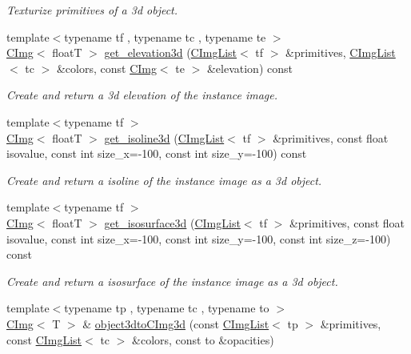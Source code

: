 \begin{DoxyCompactItemize}
\begin{DoxyCompactList}\small\item\em Texturize primitives of a 3d object. \item\end{DoxyCompactList}\item 
{\footnotesize template$<$typename tf , typename tc , typename te $>$ }\\\hyperlink{structcimg__library_1_1CImg}{CImg}$<$ floatT $>$ \hyperlink{structcimg__library_1_1CImg_af8a421b285e0b85ea6ab2fd4a2e6736e}{get\_\-elevation3d} (\hyperlink{structcimg__library_1_1CImgList}{CImgList}$<$ tf $>$ \&primitives, \hyperlink{structcimg__library_1_1CImgList}{CImgList}$<$ tc $>$ \&colors, const \hyperlink{structcimg__library_1_1CImg}{CImg}$<$ te $>$ \&elevation) const 
\begin{DoxyCompactList}\small\item\em Create and return a 3d elevation of the instance image. \item\end{DoxyCompactList}\item 
{\footnotesize template$<$typename tf $>$ }\\\hyperlink{structcimg__library_1_1CImg}{CImg}$<$ floatT $>$ \hyperlink{structcimg__library_1_1CImg_a4ba336aae4888342fc51a1cef2abd6ce}{get\_\-isoline3d} (\hyperlink{structcimg__library_1_1CImgList}{CImgList}$<$ tf $>$ \&primitives, const float isovalue, const int size\_\-x=-\/100, const int size\_\-y=-\/100) const 
\begin{DoxyCompactList}\small\item\em Create and return a isoline of the instance image as a 3d object. \item\end{DoxyCompactList}\item 
{\footnotesize template$<$typename tf $>$ }\\\hyperlink{structcimg__library_1_1CImg}{CImg}$<$ floatT $>$ \hyperlink{structcimg__library_1_1CImg_a7b242fb94ccc9d4404fb844f1ba1fa9e}{get\_\-isosurface3d} (\hyperlink{structcimg__library_1_1CImgList}{CImgList}$<$ tf $>$ \&primitives, const float isovalue, const int size\_\-x=-\/100, const int size\_\-y=-\/100, const int size\_\-z=-\/100) const 
\begin{DoxyCompactList}\small\item\em Create and return a isosurface of the instance image as a 3d object. \item\end{DoxyCompactList}\item 
\hypertarget{structcimg__library_1_1CImg_a16f244a72e1fd065ac3435b604c59beb}{
{\footnotesize template$<$typename tp , typename tc , typename to $>$ }\\\hyperlink{structcimg__library_1_1CImg}{CImg}$<$ T $>$ \& \hyperlink{structcimg__library_1_1CImg_a16f244a72e1fd065ac3435b604c59beb}{object3dtoCImg3d} (const \hyperlink{structcimg__library_1_1CImgList}{CImgList}$<$ tp $>$ \&primitives, const \hyperlink{structcimg__library_1_1CImgList}{CImgList}$<$ tc $>$ \&colors, const to \&opacities)}
\label{structcimg__library_1_1CImg_a16f244a72e1fd065ac3435b604c59beb}


\end{DoxyCompactItemize}
